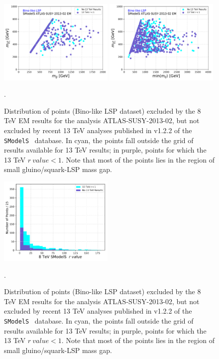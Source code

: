 \documentclass[preprint,number,sort&compress,twocolumn,3p]{elsstyarticle}
\newcommand{\SMO}{\texttt{SModelS\xspace}}
\begin{document}
\begin{figure}
\begin{center}
\subfigure
{\includegraphics[width=0.49\textwidth]{PLOTS/13TeV/13TeV_Glu_Neu.pdf}}
\subfigure
{\includegraphics[width=0.49\textwidth]{PLOTS/13TeV/13TeV_Sq_Neu.pdf}}
\end{center}
\caption{Distribution of points (Bino-like LSP dataset) excluded by the 8 TeV EM results for the analysis ATLAS-SUSY-2013-02, but not excluded by recent 13 TeV analyses published in v1.2.2 of the \SMO~ database. In cyan, the points fall outside the grid of results available for 13 TeV results; in purple, points for which the 13 TeV $r \ value <1$. Note that most of the points lies in the region of small gluino/squark-LSP mass gap.}. 
\label{13TEV}
\end{figure}
%
\begin{figure}
 	\begin{center}

 		\includegraphics[width=0.49\textwidth]{PLOTS/13TeV/rvalues.pdf}

 	\end{center}
 	\caption{Distribution of points (Bino-like LSP dataset) excluded by the 8 TeV EM results for the analysis ATLAS-SUSY-2013-02, but not excluded by recent 13 TeV analyses published in v1.2.2 of the \SMO~ database. In cyan, the points fall outside the grid of results available for 13 TeV results; in purple, points for which the 13 TeV $r \ value <1$. Note that most of the points lies in the region of small gluino/squark-LSP mass gap.}. 
 	\label{13TeVrvalue}
 \end{figure}
\end{document}
